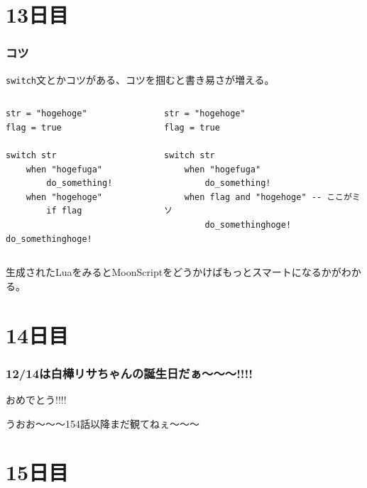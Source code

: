 \section{13日目}
\begin{frame}[fragile]
	\frametitle{コツ}
	\lstinline|switch|文とかコツがある、コツを掴むと書き易さが増える。

	\begin{columns}
		\scriptsize
		\column[t]{.5\hsize}
		\begin{lstlisting}[numbers=none,language=MoonScript]
str = "hogehoge"
flag = true

switch str
	when "hogefuga"
		do_something!
	when "hogehoge"
		if flag
			do_somethinghoge!
		\end{lstlisting}
		\column[t]{.5\hsize}
		\begin{lstlisting}[numbers=none,language=MoonScript]
str = "hogehoge"
flag = true

switch str
	when "hogefuga"
		do_something!
	when flag and "hogehoge" -- ここがミソ
		do_somethinghoge!
		\end{lstlisting}
	\end{columns}

	生成されたLuaをみるとMoonScriptをどうかけばもっとスマートになるかがわかる。
\end{frame}
\section{14日目}
\begin{frame}
	\frametitle{12/14は白樺リサちゃんの誕生日だぁ〜〜〜!!!!}
	おめでとう!!!!

	{\tiny{}うおお〜〜〜154話以降まだ観てねぇ〜〜〜}
\end{frame}
\section{15日目}

